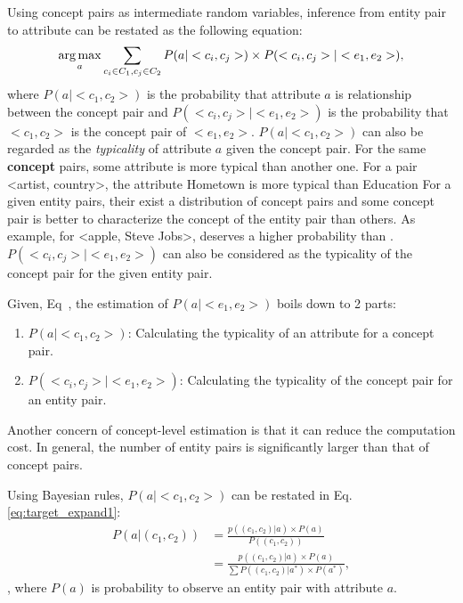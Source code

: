 Using concept pairs as intermediate random variables, inference from entity pair to attribute can be restated as the following equation:
\begin{equation}
\label{eq:target}
\operatorname*{arg\,max}_a \sum_{c_i\in C_1 , c_j \in C_2 }P(a|<c_{i},c_{j}>)\times P(<c_{i},c_{j}>|<e_{1},e_{2}>),
\end{equation}
where $P(a|<c_{1},c_{2}>)$ is the probability that attribute $a$ is relationship between the concept pair
and $P(<c_{i},c_{j}>|<e_{1},e_{2}>)$ is the probability that $<c_1, c_2>$ is the concept pair of $<e_1, e_2>$.
$P(a|<c_{1},c_{2}>)$ can also be regarded as the {\it typicality} of attribute $a$ given the concept pair.
For the same {\bf concept} pairs, some attribute is more typical than another one.
For a pair \ac{<artist, country>}, the attribute \ac{Hometown} is more typical than \ac{Education}
For a given entity pairs, their exist a distribution of concept pairs and some concept pair is better to characterize the concept of the entity pair than others.
As example,  for \ac{<apple, Steve Jobs>},   deserves a higher probability than .
$P(<c_{i},c_{j}>|<e_{1},e_{2}>)$ can also be considered as the typicality of the concept pair for the given entity pair.

Given, Eq~\label{eq:target}, the estimation of $P(a|<e_1,e_2>)$ boils down to 2 parts:
\begin{enumerate}
\item $P(a|<c_{1},c_{2}>)$: Calculating the typicality of an attribute for a concept pair.
\item $P(<c_{i},c_{j}>|<e_{1},e_{2}>)$: Calculating the typicality of the concept pair for an entity pair.
\end{enumerate}

Another concern of concept-level estimation is that it can reduce the computation cost.
In general, the number of entity pairs is significantly larger than that of concept pairs.

Using Bayesian rules, $P(a|<c_{1},c_{2}>)$ can be restated in Eq.\ref{eq:target_expand1}:
\begin{equation}
\label{eq:target_expand1}
\begin{split}
P(a|(c_{1},c_{2})) &= \frac{ p((c_{1},c_{2})|a)\times P(a) }{ P( (c_{1},c_{2}) ) }\\
&=\frac{ p((c_{1},c_{2})|a)\times P(a) }{ \sum{P( (c_{1},c_{2})|a^* )\times P(a^*)   } },
\end{split}
\end{equation},
where $P(a)$ is probability to observe an entity pair with attribute $a$.

